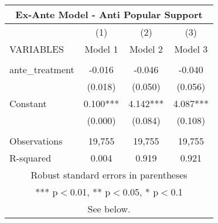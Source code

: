 \begin{tabular}{lccc}
\multicolumn{4}{c}{Ex-Ante Model - Anti Popular Support} \\ \hline
 & (1) & (2) & (3) \\
VARIABLES & Model 1 & Model 2 & Model 3 \\ \hline
 &  &  &  \\
ante\_treatment & -0.016 & -0.046 & -0.040 \\
 & (0.018) & (0.050) & (0.056) \\
Constant & 0.100*** & 4.142*** & 4.087*** \\
 & (0.000) & (0.084) & (0.108) \\
 &  &  &  \\
Observations & 19,755 & 19,755 & 19,755 \\
 R-squared & 0.004 & 0.919 & 0.921 \\ \hline
\multicolumn{4}{c}{ Robust standard errors in parentheses} \\
\multicolumn{4}{c}{ *** p$<$0.01, ** p$<$0.05, * p$<$0.1} \\
\multicolumn{4}{c}{ See below.} \\
\end{tabular}
